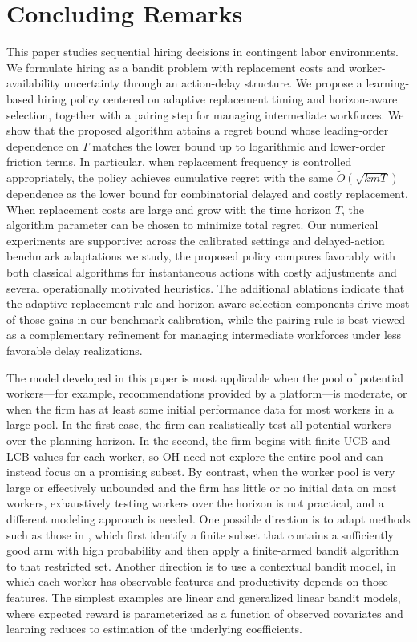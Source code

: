 \documentclass[opre,blindrev]{informs3}
\begin{document}
\section{Concluding Remarks}\label{sec:conclusion}
This paper studies sequential hiring decisions in contingent labor environments. We formulate hiring as a bandit problem with replacement costs and worker-availability uncertainty through an action-delay structure. We propose a learning-based hiring policy centered on adaptive replacement timing and horizon-aware selection, together with a pairing step for managing intermediate workforces. We show that the proposed algorithm attains a regret bound whose leading-order dependence on \(T\) matches the lower bound up to logarithmic and lower-order friction terms. In particular, when replacement frequency is controlled appropriately, the policy achieves cumulative regret with the same \(\tilde{O}(\sqrt{kmT})\) dependence as the lower bound for combinatorial delayed and costly replacement. When replacement costs are large and grow with the time horizon \(T\), the algorithm parameter can be chosen to minimize total regret. Our numerical experiments are supportive: across the calibrated settings and delayed-action benchmark adaptations we study, the proposed policy compares favorably with both classical algorithms for instantaneous actions with costly adjustments and several operationally motivated heuristics. The additional ablations indicate that the adaptive replacement rule and horizon-aware selection components drive most of those gains in our benchmark calibration, while the pairing rule is best viewed as a complementary refinement for managing intermediate workforces under less favorable delay realizations.

The model developed in this paper is most applicable when the pool of potential workers---for example, recommendations provided by a platform---is moderate, or when the firm has at least some initial performance data for most workers in a large pool. In the first case, the firm can realistically test all potential workers over the planning horizon. In the second, the firm begins with finite UCB and LCB values for each worker, so \textsc{OH} need not explore the entire pool and can instead focus on a promising subset. By contrast, when the worker pool is very large or effectively unbounded and the firm has little or no initial data on most workers, exhaustively testing workers over the horizon is not practical, and a different modeling approach is needed. One possible direction is to adapt methods such as those in \cite{wang2008algorithms}, which first identify a finite subset that contains a sufficiently good arm with high probability and then apply a finite-armed bandit algorithm to that restricted set. Another direction is to use a contextual bandit model, in which each worker has observable features and productivity depends on those features. The simplest examples are linear and generalized linear bandit models, where expected reward is parameterized as a function of observed covariates and learning reduces to estimation of the underlying coefficients.
\end{document}
